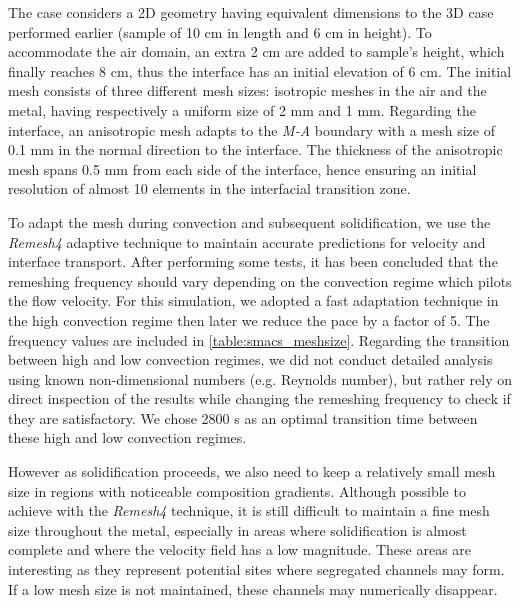 The case considers a 2D geometry having equivalent dimensions to the 3D case performed earlier (sample of 10 cm in length and 6 cm in height).
To accommodate the air domain, an extra 2 cm are added to sample's height, which finally reaches 8 cm, thus the interface has an initial elevation of 6 cm. 
The initial mesh consists of three different mesh sizes: isotropic meshes in the air and the metal, having respectively a uniform size of 2 mm and 1 mm.
Regarding the interface, an anisotropic mesh adapts to the \emph{M-A} boundary with a mesh size of 0.1 mm in the normal direction to the interface.
The thickness of the anisotropic mesh spans 0.5 mm from each side of the interface, hence ensuring an initial resolution of almost 10 elements in the interfacial transition zone.

To adapt the mesh during convection and subsequent solidification, we use the \emph{Remesh4} adaptive technique to maintain accurate predictions for velocity and interface transport.
After performing some tests, it has been concluded that the remeshing
frequency should vary depending on the convection regime which pilots the flow velocity.
For this simulation, we adopted a fast adaptation technique in the high convection regime
then later we reduce the pace by a factor of 5. The frequency values are included in \cref{table:smacs_meshsize}. 
Regarding the transition between high and low convection regimes, we did not conduct detailed analysis using 
known non-dimensional numbers (e.g. Reynolds number), but rather rely on direct inspection of the results while changing the remeshing frequency
to check if they are satisfactory. We chose 2800 s as an optimal transition time between these high and low convection regimes.

However as solidification proceeds, we also need to keep a relatively small mesh size in regions with noticeable composition gradients.
Although possible to achieve with the \emph{Remesh4} technique, it is still difficult to maintain a fine mesh size throughout the metal, especially in areas
where solidification is almost complete and where the velocity field has a low magnitude. These areas are interesting as they represent potential
sites where segregated channels may form. If a low mesh size is not maintained, these channels may numerically disappear. 

